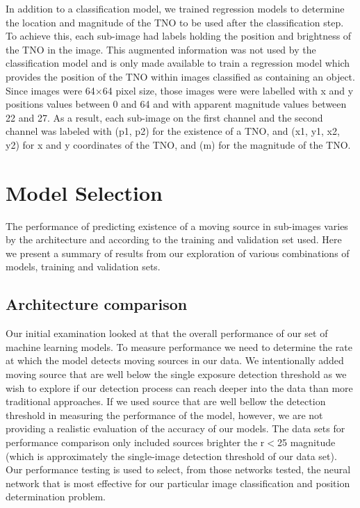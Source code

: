 In addition to a classification model, we trained regression models to determine the location and magnitude of the TNO to be used after the classification step.
To achieve this, each sub-image had labels holding the position and brightness of the TNO in the image.
This augmented information was not used by the classification model and is only made available to train a regression model which provides the position of the TNO within images classified as containing an object.
Since images were 64$\times$64 pixel size, those images were were labelled with x and y positions values between 0 and 64 and with apparent magnitude values between 22 and 27.
As a result, each sub-image on the first channel and the second channel was labeled with (p1, p2) for the existence of a TNO, and (x1, y1, x2, y2) for x and y coordinates of the TNO, and (m) for the magnitude of the TNO.

\section{Model Selection}
\label{sect: Model Selection}
The performance of predicting existence of a moving source in sub-images varies by the architecture and according to the training and validation set used.
Here we present a summary of results from our exploration of various combinations of models, training and validation sets.
 
\subsection{Architecture comparison}
\label{subsect:Architecture comparison}
Our initial examination looked at that the overall performance of our set of machine learning models.
To measure performance we need to determine the rate at which the model detects moving sources in our data.  
We intentionally added moving source that are well below the single exposure detection threshold as we wish to explore if our detection process can reach deeper into the data than more traditional approaches.
If we used source that are well bellow the detection threshold in measuring the performance of the model, however, we are not providing a realistic evaluation of the accuracy of our models.
The data sets for performance comparison only included sources brighter the r$<$25 magnitude (which is approximately the single-image detection threshold of our data set).  
Our performance testing is used to select, from those networks tested, the neural network that is most effective for our particular image classification and position determination problem.

